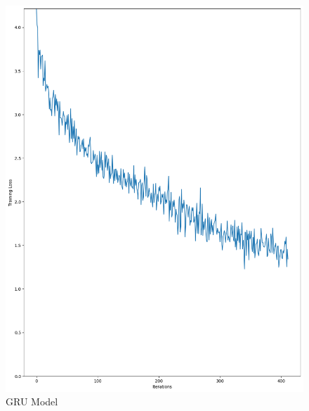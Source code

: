 \documentclass{article}
\begin{document}
\begin{figure}[htbp]
    \centering
    \begin{minipage}[b]{0.2\textwidth}
        \centering
        \includegraphics[width=\textwidth]{img/GRU_learning.png}
        \caption{GRU Model}
        \label{fig:gru}
    \end{minipage}
    \hfill
    \begin{minipage}[b]{0.2\textwidth}
        \centering

\end{minipage}
\end{figure}
\end{document}
